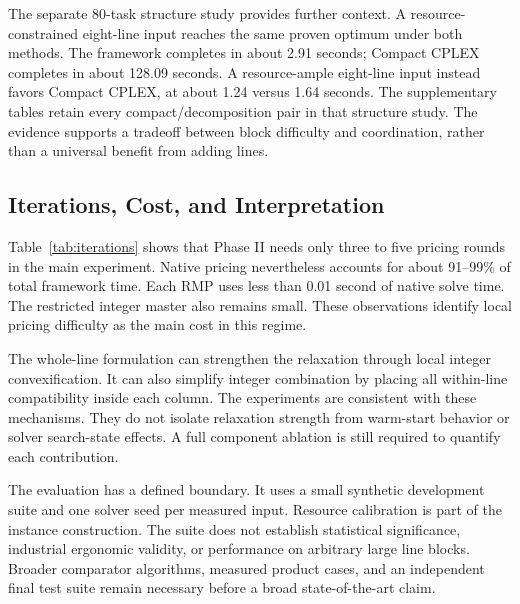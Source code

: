 The separate 80-task structure study provides further context. A resource-constrained eight-line input reaches the same proven optimum under both methods. The framework completes in about 2.91 seconds; Compact CPLEX completes in about 128.09 seconds. A resource-ample eight-line input instead favors Compact CPLEX, at about 1.24 versus 1.64 seconds. The supplementary tables retain every compact/decomposition pair in that structure study. The evidence supports a tradeoff between block difficulty and coordination, rather than a universal benefit from adding lines.

\subsection{Iterations, Cost, and Interpretation}

Table~\ref{tab:iterations} shows that Phase II needs only three to five pricing rounds in the main experiment. Native pricing nevertheless accounts for about 91--99\% of total framework time. Each RMP uses less than 0.01 second of native solve time. The restricted integer master also remains small. These observations identify local pricing difficulty as the main cost in this regime.

The whole-line formulation can strengthen the relaxation through local integer convexification. It can also simplify integer combination by placing all within-line compatibility inside each column. The experiments are consistent with these mechanisms. They do not isolate relaxation strength from warm-start behavior or solver search-state effects. A full component ablation is still required to quantify each contribution.

The evaluation has a defined boundary. It uses a small synthetic development suite and one solver seed per measured input. Resource calibration is part of the instance construction. The suite does not establish statistical significance, industrial ergonomic validity, or performance on arbitrary large line blocks. Broader comparator algorithms, measured product cases, and an independent final test suite remain necessary before a broad state-of-the-art claim.
